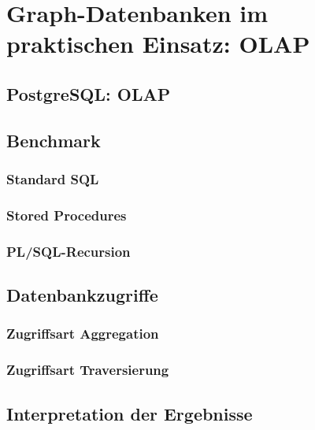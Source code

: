 \chapter{Graph-Datenbanken im praktischen Einsatz: OLAP}
\section{PostgreSQL: OLAP}
\section{Benchmark}
\subsection{Standard SQL}
\subsection{Stored Procedures}
\subsection{PL/SQL-Recursion}
\section{Datenbankzugriffe}
\subsection{Zugriffsart Aggregation}
\subsection{Zugriffsart Traversierung}
\section{Interpretation der Ergebnisse}